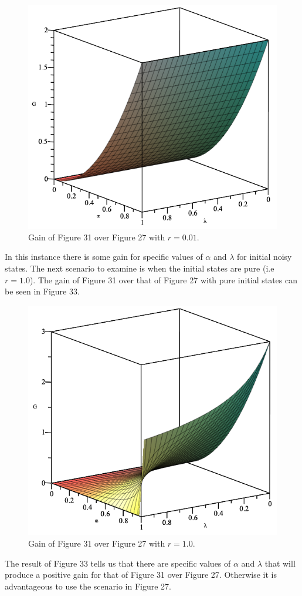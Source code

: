 \documentclass[twocolumn]{article}
\begin{document}
\begin{figure}[h]
\begin{center}
\includegraphics[width=0.65\linewidth]{Depolarizing-Double-Channel-Alpha-and-Lambda-r=001-Gain-Graph.png}
\caption{Gain of Figure 31 over Figure 27 with $r=0.01$.}
\end{center}
\end{figure}
\newline
In this instance there is some gain for specific values of $\alpha$ and $\lambda$ for initial noisy states. The next scenario to examine is when the initial states are pure (i.e $r=1.0$). The gain of Figure 31 over that of Figure 27 with pure initial states can be seen in Figure 33.
\begin{figure}[h]
\begin{center}
\includegraphics[width=0.65\linewidth]{Depolarizing-Double-Channel-Alpha-and-Lambda-r=1-Gain-Graph.png}
\caption{Gain of Figure 31 over Figure 27 with $r=1.0$.}
\end{center}
\end{figure}
\newline
The result of Figure 33 tells us that there are specific values of $\alpha$ and $\lambda$ that will produce a positive gain for that of Figure 31 over Figure 27. Otherwise it is advantageous to use the scenario in Figure 27.
\end{document}

